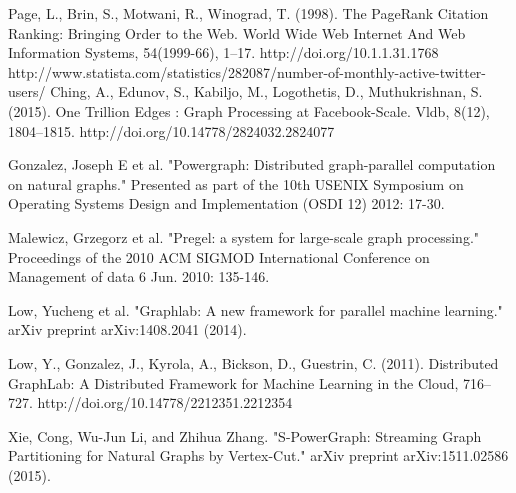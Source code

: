 \documentclass[12pt]{report}
\numberwithin{figure}{section}
\numberwithin{table}{section}
\begin{document}
\begin{thebibliography}{1}

   Page, L., Brin, S., Motwani, R.,  Winograd, T. (1998). The PageRank Citation Ranking: Bringing Order to the Web. World Wide Web Internet And Web Information Systems, 54(1999-66), 1–17. http://doi.org/10.1.1.31.1768
   http://www.statista.com/statistics/282087/number-of-monthly-active-twitter-users/
   Ching, A., Edunov, S., Kabiljo, M., Logothetis, D.,  Muthukrishnan, S. (2015). One Trillion Edges : Graph Processing at Facebook-Scale. Vldb, 8(12), 1804–1815. http://doi.org/10.14778/2824032.2824077
  
   Gonzalez, Joseph E et al. "Powergraph: Distributed graph-parallel computation on natural graphs." Presented as part of the 10th USENIX Symposium on Operating Systems Design and Implementation (OSDI 12) 2012: 17-30.

    Malewicz, Grzegorz et al. "Pregel: a system for large-scale graph processing." Proceedings of the 2010 ACM SIGMOD International Conference on Management of data 6 Jun. 2010: 135-146.

   Low, Yucheng et al. "Graphlab: A new framework for parallel machine learning." arXiv preprint arXiv:1408.2041 (2014).
  
   Low, Y., Gonzalez, J., Kyrola, A., Bickson, D.,  Guestrin, C. (2011). Distributed GraphLab: A Distributed Framework for Machine Learning in the Cloud, 716–727. http://doi.org/10.14778/2212351.2212354
  
   Xie, Cong, Wu-Jun Li, and Zhihua Zhang. "S-PowerGraph: Streaming Graph Partitioning for Natural Graphs by Vertex-Cut." arXiv preprint arXiv:1511.02586 (2015).
  

\end{thebibliography}
\end{document}
